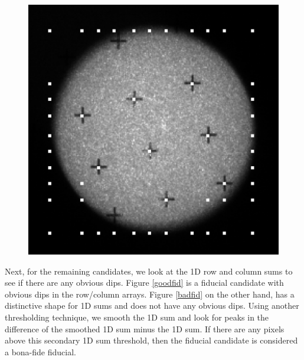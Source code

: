 \documentclass[10pt]{scrartcl}
\begin{document}
\begin{figure}[!ht]
{\begin{subfloatrow}
{        \includegraphics[width=.9\linewidth]{../plots_tables_images/dimenough.eps}
        }
        {
        }
    \end{subfloatrow}
}
{
\caption{}
\label{rulingout}
}
\end{figure}


Next, for the remaining candidates, we look at the 1D row and column sums to see if there are any obvious dips. Figure \ref{goodfid} is a fiducial candidate with obvious dips in the row/column arrays. Figure \ref{badfid} on the other hand, has a distinctive shape for 1D sums and does not have any obvious dips. Using another thresholding technique, we smooth the 1D sum and look for peaks in the difference of the smoothed 1D sum minus the 1D sum. If there are any pixels above this secondary 1D sum threshold, then the fiducial candidate is considered a bona-fide fiducial.  
\end{document}
